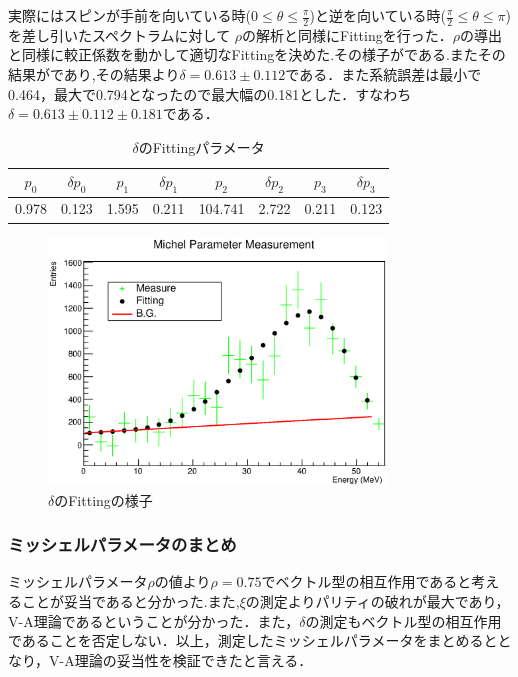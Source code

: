 実際にはスピンが手前を向いている時($0\leq\theta\leq\frac{\pi}{2}$)と逆を向いている時($\frac{\pi}{2}\leq\theta\leq\pi$)を差し引いたスペクトラムに対して
$\rho$の解析と同様にFittingを行った．$\rho$の導出と同様に較正係数を動かして適切なFittingを決めた.その様子がである.またその結果がであり,その結果より$\delta=0.613\pm0.112$である．また系統誤差は最小で0.464，最大で0.794となったので最大幅の0.181とした．すなわち$\delta=0.613\pm0.112\pm0.181$である．
\begin{table}[bht]
  \centering
  \caption{$\delta$のFittingパラメータ}
  \begin{tabular}{cccccccc}
    $p_0$ & $\delta p_0$ & $p_1$ & $\delta p_1$ & $p_2$ & $\delta p_2$ & $p_3$ & $\delta p_3$ \\ \hline
    0.978 & 0.123 & 1.595 & 0.211 & 104.741 & 2.722 & 0.211 & 0.123 \\
  \end{tabular}
  \label{hatano_tab:delta}
\end{table}

\begin{figure}[bht]
  \centering
  \includegraphics[width=0.8\textwidth]{figure/hatano/delta.eps}
  \caption{$\delta$のFittingの様子}
  \label{hatano_fig:delta}
\end{figure}

\subsubsection{ミッシェルパラメータのまとめ}
ミッシェルパラメータ$\rho$の値より$\rho=0.75$でベクトル型の相互作用であると考えることが妥当であると分かった.また,$\xi$の測定よりパリティの破れが最大であり，V-A理論であるということが分かった．また，$\delta$の測定もベクトル型の相互作用であることを否定しない．以上，測定したミッシェルパラメータをまとめるととなり，V-A理論の妥当性を検証できたと言える．

